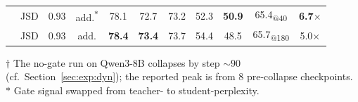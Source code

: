 \begin{table}[t]
\begin{tabular}{l|ccc|cccccc|c}
                             & JSD          & $0.93$                              & add.\textsuperscript{$\ast$} & 78.1            & 72.7            & 73.2            & 52.3            & \textbf{50.9}    & 65.4\textsubscript{@40}                            & \textbf{6.7$\times$} \\
    \rowcolor{antisdrow}{}   & {JSD}        & {0.93}                              & {add.}                       & \textbf{78.4}   & \textbf{73.4}   & 73.7            & 54.4            & 48.5             & 65.7\textsubscript{@180}                           & 5.0$\times$          \\
    \bottomrule
  \end{tabular}
  \par\smallskip
  {\footnotesize $\dagger$ The no-gate run on Qwen3-8B collapses by step $\sim 90$ (cf.\ Section~\ref{sec:exp:dyn}); the reported peak is from $8$ pre-collapse checkpoints. $\ast$ Gate signal swapped from teacher- to student-perplexity.}
\end{table}
